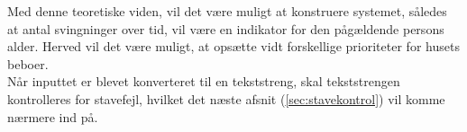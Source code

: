 Med denne teoretiske viden, vil det være muligt at konstruere systemet, således at antal svingninger over tid, vil være en indikator for den pågældende persons alder. Herved vil det være muligt, at opsætte vidt forskellige prioriteter for husets beboer. \\

Når inputtet er blevet konverteret til en tekststreng, skal tekststrengen kontrolleres for stavefejl, hvilket det næste afsnit (\ref{sec:stavekontrol}) vil komme nærmere ind på.